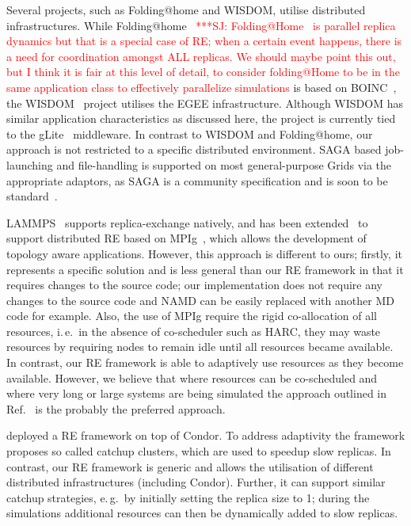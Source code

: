 \documentclass{rspublic}
\newcommand{\jhanote}[1]{ {\textcolor{red} { ***SJ: #1 }}}
\newcommand{\jhanote}[1]{}
\begin{document}
Several projects, such as Folding@home and WISDOM, utilise distributed
infrastructures. While
Folding@home~\citep{PhysRevLett.86.4983}\jhanote{Folding@Home~\citep{PhysRevLett.86.4983}
is parallel replica dynamics but that is a special case of
RE; when a certain event happens, there is a need for
coordination amongst ALL replicas. We should maybe point this out,
but I think it is fair at this level of detail, to consider
folding@Home to be in the same application class to effectively
parallelize simulations} is based on BOINC~\citep{1033223}, the
WISDOM~\citep{wisdom} project utilises the EGEE infrastructure. 
Although WISDOM has similar application characteristics as discussed
here, the project is currently tied to the gLite~\citep{glite}
middleware.  In contrast to WISDOM and Folding@home, our approach is
not restricted to a specific distributed environment. SAGA based
job-launching and file-handling is supported on most general-purpose
Grids via the appropriate adaptors, as SAGA is a community
specification and is soon to be standard~\citep{saga_url}.       

LAMMPS~\citep{Plimpton:1995nx,repex_mpig} supports replica-exchange
natively, and has been extended~\cite{repex_mpig} to support
distributed RE based on MPIg~\citep{Toonen:2008ao}, which allows the
development of topology aware applications. However, this approach is
different to ours; firstly, it represents a specific solution and is
less general than our RE framework in that it requires changes to the
source code; our implementation does not require any changes to the
source code and NAMD can be easily replaced with another MD code for
example.  Also, the use of MPIg require the rigid co-allocation of all
resources, i.\,e.\ in the absence of co-scheduler such as HARC, they
may waste resources by requiring nodes to remain idle until all
resources became available.  In contrast, our RE framework is able to
adaptively use resources as they become available. However, we believe
that where resources can be co-scheduled and where very long or large
systems are being simulated the approach outlined in
Ref.~\citep{repex_mpig} is the probably the preferred approach.

\cite{Woods:2005nx} deployed a RE framework on top of Condor.  To
address adaptivity the framework proposes so called catchup clusters,
which are used to speedup slow replicas. In contrast, our RE framework
is generic and allows the utilisation of different distributed
infrastructures (including Condor). Further, it can support similar
catchup strategies, e.\,g.\ by initially setting the replica size to
1; during the simulations additional resources can then be dynamically
added to slow replicas.
\end{document}
